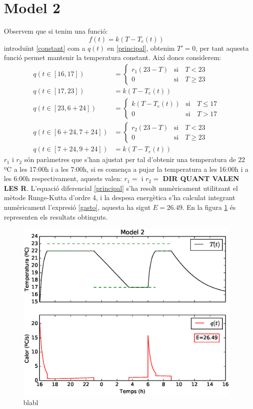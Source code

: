 \documentclass[11pt]{article}
\begin{document}
	\section{Model 2}
	Observem que si tenim una funció:
	\begin{equation}\label{constant}
		f(t)=k(T-T_e(t))
	\end{equation}
	introduïnt \eqref{constant} com a $q(t)$ en \eqref{principal}, obtenim $T'=0$, per tant aquesta funció permet mantenir la temperatura constant. Així doncs considerem:
	\begin{align} 
	q(t\in[16,17])&=
	\begin{cases}
	r_1(23-T)&\text{si}\quad T<23\\
	0&\text{si}\quad T\geq23
	\end{cases}
	\\
	q(t\in[17,23])&=k(T-T_e(t))\\
	q(t\in[23,6+24])&=
	\begin{cases}
	k(T-T_e(t))&\text{si}\quad T\leq17\\
	0&\text{si}\quad T>17
	\end{cases}
	\\
		q(t\in[6+24,7+24])&=
		\begin{cases}
		r_2(23-T)&\text{si}\quad T<23\\
		0&\text{si}\quad T\geq23
		\end{cases}
		\\
	q(t\in[7+24,9+24])&=k(T-T_e(t))
	\end{align}
	$r_1$ i $r_2$ són paràmetres que s'han ajustat per tal d'obtenir una temperatura de $22$ºC a les 17:00h i a les 7:00h, si es comença a pujar la temperatura a les 16:00h i a les 6:00h respectivament, aquests valen: $r_1=$ i $r_2=$ \textbf{DIR QUANT VALEN LES R}. L'equació diferencial \eqref{principal} s'ha resolt numèricament utilitzant el mètode Runge-Kutta d'ordre 4, i la despesa energètica s'ha calculat integrant numèricament l'expresió \eqref{gasto}, aquesta ha sigut $E=26.49$. En la figura \ref{figmodel2} és representen els resultats obtinguts.
	\begin{figure}[h!]
		\centering
		\includegraphics[width=12cm]{model2.eps}
		\caption{blabl}
		\label{figmodel2}
	\end{figure}
\end{document}
